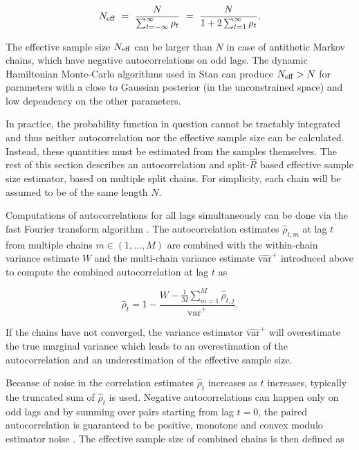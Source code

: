 \documentclass[american,]{article}
\begin{document}
\begin{equation}
N_{\rm eff} \ = \
\frac{N}{\sum_{t = -\infty}^{\infty} \rho_t} \ = \
\frac{N}{1 + 2 \sum_{t = 1}^{\infty} \rho_t}.
\end{equation}

The effective sample size \(N_{\rm eff}\) can be larger than \(N\) in case
of antithetic Markov chains, which have negative autocorrelations on odd
lags. The dynamic Hamiltonian Monte-Carlo algorithms used in Stan
\citep{Hoffman+Gelman:2014, betancourt2017conceptual} can produce
\(N_{\rm eff}>N\) for parameters with a close to Gaussian posterior (in
the unconstrained space) and low dependency on the other parameters.

In practice, the probability function in question cannot be tractably
integrated and thus neither autocorrelation nor the effective sample
size can be calculated. Instead, these quantities must be estimated from
the samples themselves. The rest of this section describes an
autocorrelation and split-\(\widehat{R}\) based effective sample size
estimator, based on multiple split chains. For simplicity, each chain
will be assumed to be of the same length \(N\).

Computations of autocorrelations for all lags simultaneously can be done
via the fast Fourier transform algorithm \citep[FFT; see][ for more
details]{Geyer:2011}. The autocorrelation estimates \(\hat{\rho}_{t,m}\)
at lag \(t\) from multiple chains \(m \in (1,\ldots,M)\) are combined
with the within-chain variance estimate \(W\) and the multi-chain
variance estimate \(\widehat{\mbox{var}}^{+}\) introduced above to
compute the combined autocorrelation at lag \(t\) as

\begin{equation}
\hat{\rho}_t
= 1 - \frac{\displaystyle W - \textstyle \frac{1}{M}\sum_{m=1}^M 
\hat{\rho}_{t,j}}{\widehat{\mbox{var}}^{+}}. \label{rhohat}
\end{equation}

If the chains have not converged, the variance estimator
\(\widehat{\mbox{var}}^{+}\) will overestimate the true marginal
variance which leads to an overestimation of the autocorrelation and an
underestimation of the effective sample size.

Because of noise in the correlation estimates \(\hat{\rho}_t\) increases
as \(t\) increases, typically the truncated sum of \(\hat{\rho}_t\) is
used. Negative autocorrelations can happen only on odd lags and by
summing over pairs starting from lag \(t=0\), the paired autocorrelation
is guaranteed to be positive, monotone and convex modulo estimator noise
\citep{Geyer:1992, Geyer:2011}. The effective sample size of combined
chains is then defined as
\end{document}
